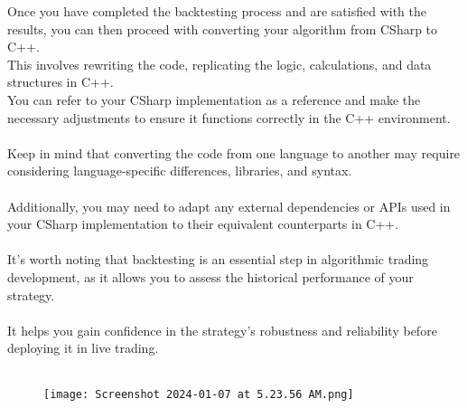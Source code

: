 \documentclass{assignment}
\begin{document}
\begin{problem}
\noindent Once you have completed the backtesting process and are satisfied with the results, you can then proceed with converting your algorithm from CSharp to C++.\\
This involves rewriting the code, replicating the logic, calculations, and data structures in C++.\\
You can refer to your CSharp implementation as a reference and make the necessary adjustments to ensure it functions correctly in the C++ environment.\\\\
Keep in mind that converting the code from one language to another may require considering language-specific differences, libraries, and syntax.\\\\
Additionally, you may need to adapt any external dependencies or APIs used in your CSharp implementation to their equivalent counterparts in C++.\\\\
It's worth noting that backtesting is an essential step in algorithmic trading development, as it allows you to assess the historical performance of your strategy.\\\\
It helps you gain confidence in the strategy's robustness and reliability before deploying it in live trading.\\\\

\begin{figure}
    \centering
    \texttt{[image: Screenshot 2024-01-07 at 5.23.56 AM.png]}
    \label{fig:enter-label}
\end{figure}

\end{problem}


    




\newpage

\nocite{*} %

\end{document}
